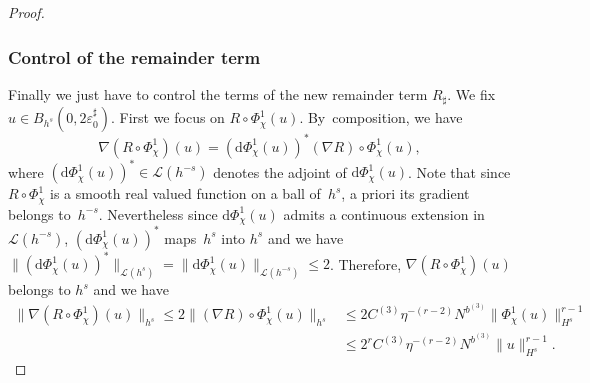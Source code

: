 \documentclass[11pt]{article}
\theoremstyle{definition}
\begin{document}
\begin{proof}
\subsubsection*{Control of the remainder term}
Finally we just have to control the terms of the new remainder term $R_\sharp$. We fix $u\in B_{h^s}(0,2 \varepsilon_0^\sharp)$. First we focus on $R \circ \Phi_\chi^1(u)$. By~composition, we have
\[
\nabla (R \circ \Phi_\chi^1)(u) = (\mathrm{d}\Phi_\chi^1(u))^* (\nabla R) \circ \Phi_\chi^1(u),
\]
where $ (\mathrm{d}\Phi_\chi^1(u))^* \in \mathscr{L}(h^{-s})$ denotes the adjoint of $\mathrm{d}\Phi_\chi^1(u)$. Note that since $R \circ \Phi_\chi^1$ is a smooth real valued function on a ball of~$h^s$, a priori its gradient belongs to~$h^{-s}$. Nevertheless since $\mathrm{d}\Phi_\chi^1(u)$ admits a continuous extension in $\mathscr{L}(h^{-s})$, $(\mathrm{d}\Phi_\chi^1(u))^*$ maps~$h^s$ into $h^s$ and we have $\|(\mathrm{d}\Phi_\chi^1(u))^* \|_{\mathscr{L}(h^{s})} = \|\mathrm{d}\Phi_\chi^1(u) \|_{\mathscr{L}(h^{-s})} \leq 2$. Therefore, \hbox{$\nabla (R \circ \Phi_\chi^1)(u)$} belongs to $h^s$ and we have
\begin{equation*}
\begin{split}
\| \nabla (R \circ \Phi_\chi^1)(u) \|_{h^s} \leq 2 \| (\nabla R) \circ \Phi_\chi^1(u) \|_{h^s} &\leq 2 C^{(3)} \eta^{-(r-2)} N^{b^{(3)}} \|\Phi_\chi^1(u) \|_{H^s}^{r-1} \\
&\leq 2^r C^{(3)} \eta^{-(r-2)} N^{b^{(3)}} \| u \|_{H^s}^{r-1}.
\end{split}
\end{equation*}


\end{proof}
\end{document}
